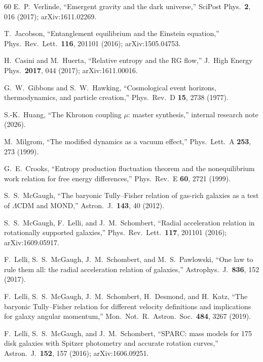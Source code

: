 \documentclass[prd,twocolumn,superscriptaddress,longbibliography,floatfix]{revtex4-2}
\begin{document}
\begin{thebibliography}{60}
E.~P.~Verlinde,
``Emergent gravity and the dark universe,''
SciPost Phys.\ \textbf{2}, 016 (2017);
arXiv:1611.02269.

T.~Jacobson,
``Entanglement equilibrium and the Einstein equation,''
Phys.\ Rev.\ Lett.\ \textbf{116}, 201101 (2016);
arXiv:1505.04753.

H.~Casini and M.~Huerta,
``Relative entropy and the RG flow,''
J.\ High Energy Phys.\ \textbf{2017}, 044 (2017);
arXiv:1611.00016.

G.~W.~Gibbons and S.~W.~Hawking,
``Cosmological event horizons, thermodynamics, and particle
creation,''
Phys.\ Rev.\ D \textbf{15}, 2738 (1977).

S.-K.~Huang,
``The Khronon coupling $\mu$: master synthesis,''
internal research note (2026).

M.~Milgrom,
``The modified dynamics as a vacuum effect,''
Phys.\ Lett.\ A \textbf{253}, 273 (1999).

G.~E.~Crooks,
``Entropy production fluctuation theorem and the nonequilibrium
work relation for free energy differences,''
Phys.\ Rev.\ E \textbf{60}, 2721 (1999).

S.~S.~McGaugh,
``The baryonic Tully--Fisher relation of gas-rich galaxies as a
test of $\Lambda$CDM and MOND,''
Astron.\ J.\ \textbf{143}, 40 (2012).

S.~S.~McGaugh, F.~Lelli, and J.~M.~Schombert,
``Radial acceleration relation in rotationally supported galaxies,''
Phys.\ Rev.\ Lett.\ \textbf{117}, 201101 (2016);
arXiv:1609.05917.

F.~Lelli, S.~S.~McGaugh, J.~M.~Schombert, and M.~S.~Pawlowski,
``One law to rule them all: the radial acceleration relation
of galaxies,''
Astrophys.\ J.\ \textbf{836}, 152 (2017).

F.~Lelli, S.~S.~McGaugh, J.~M.~Schombert, H.~Desmond,
and H.~Katz,
``The baryonic Tully--Fisher relation for different velocity
definitions and implications for galaxy angular momentum,''
Mon.\ Not.\ R.\ Astron.\ Soc.\ \textbf{484}, 3267 (2019).

F.~Lelli, S.~S.~McGaugh, and J.~M.~Schombert,
``SPARC: mass models for 175 disk galaxies with Spitzer
photometry and accurate rotation curves,''
Astron.\ J.\ \textbf{152}, 157 (2016);
arXiv:1606.09251.


\end{thebibliography}
\end{document}
